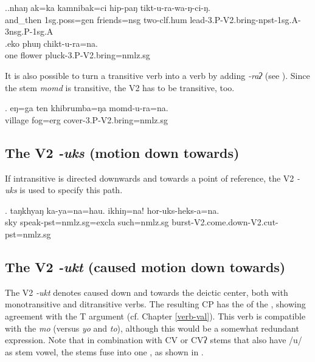 \ex.\ag.nhaŋ    ak=ka kamnibak=ci hip-paŋ tikt-u-ra-wa-ŋ-ci-ŋ.\\
and\_then {\sc 1sg.poss=gen} friends{\sc =nsg} two{\sc -clf.hum} lead{\sc -3.P-V2.bring-npst-1sg.A-3nsg.P-1sg.A}\\
\bg.eko phuŋ chikt-u-ra=na.\\
one flower pluck{\sc [3sg.A;pst]-3.P-V2.bring=nmlz.sg}\\


It is also possible to turn a transitive verb into a  verb by adding \emph{-raʔ} (see \Next). Since the stem \emph{momd}  is transitive, the V2 has to be transitive, too. 

\exg. eŋ=ga ten khibrumba=ŋa momd-u-ra=na.\\
 village fog{\sc =erg} cover{\sc [3sg.A;pst]-3.P-V2.bring=nmlz.sg}\\


\subsection{The V2 \emph{-uks} (motion down towards)}\label{V2-comedown}%

If intransitive   is directed downwards and towards a point of reference, the V2 \emph{-uks}  is used to specify this path.

\exg. taŋkhyaŋ ka-ya=na=hau. ikhiŋ=na! hor-uks-heks-a=na.\\
sky speak{\sc [3sg]-pst=nmlz.sg=excla} such{\sc =nmlz.sg} burst{\sc -V2.come.down-V2.cut-pst=nmlz.sg}\\
 

\subsection{The V2 \emph{-ukt}  (caused motion down towards)}\label{V2-bringdown}%

The V2 \emph{-ukt}  denotes caused  down and towards the deictic center, both with monotransitive and ditransitive verbs. The resulting CP has the  of the , showing agreement with the T argument (cf. Chapter \ref{verb-val}). This verb is compatible with the  \emph{mo}  (versus \emph{yo} and \emph{to}), although this would be a somewhat redundant expression. Note that in combination with CV or CVʔ stems that also have /u/ as stem vowel, the stems fuse into one , as shown in \Next[b].

